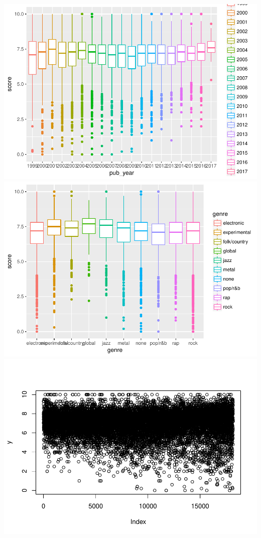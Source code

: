 \documentclass{article}
\begin{document}
\includegraphics{report_files/figure-latex/unnamed-chunk-2-1.pdf}
\includegraphics{report_files/figure-latex/unnamed-chunk-2-2.pdf}
\includegraphics{report_files/figure-latex/unnamed-chunk-2-3.pdf}
\end{document}
